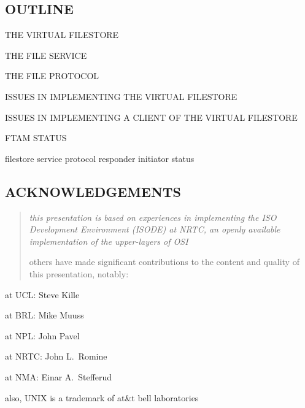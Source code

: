 \begin{bwslide}
\part*	{OUTLINE}

\begin{nrtc}\bf
\item	THE VIRTUAL FILESTORE

\item	THE FILE SERVICE

\item	THE FILE PROTOCOL

\item	ISSUES IN IMPLEMENTING THE VIRTUAL FILESTORE

\item	ISSUES IN IMPLEMENTING A CLIENT OF THE VIRTUAL FILESTORE

\item	FTAM STATUS
\end{nrtc}
\end{bwslide}

	{filestore}
	{service}
	{protocol}
	{responder}
	{initiator}
	{status}

\begin{bwslide}
\part*	{ACKNOWLEDGEMENTS}

\begin{quote}\em
this presentation is based on experiences in implementing the
ISO Development Environment (ISODE) at NRTC,
an openly available implementation of the upper-layers of OSI

others have made significant contributions to the content and quality of this
presentation,
notably:
\end{quote}

\begin{nrtc}\em
\item	at UCL: Steve Kille

\item	at BRL: Mike Muuss

\item	at NPL: John Pavel

\item	at NRTC: John L.~Romine

\item	at NMA: Einar A.~Stefferud
\end{nrtc}

also, UNIX is a trademark of at\&t bell laboratories
\end{bwslide}



